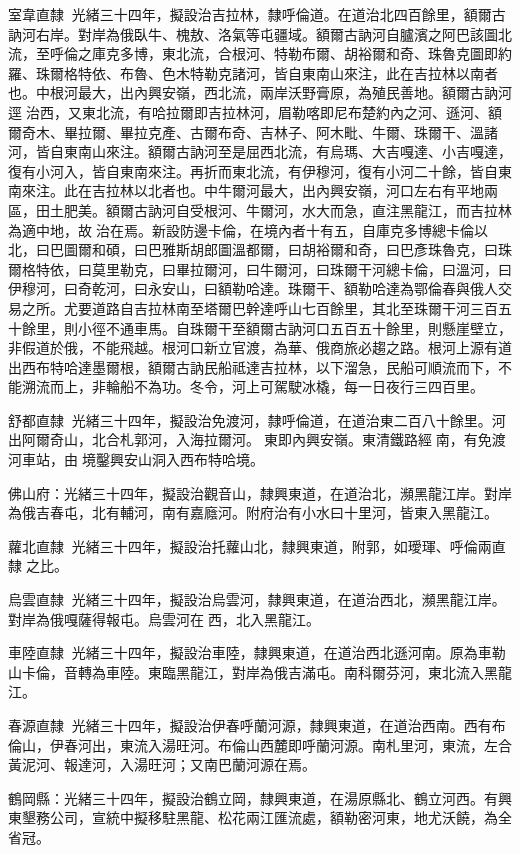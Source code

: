 \begin{pinyinscope}
室韋直隸：光緒三十四年，擬設治吉拉林，隸呼倫道。在道治北四百餘里，額爾古訥河右岸。對岸為俄臥牛、槐敖、洛氣等屯疆域。額爾古訥河自臚濱之阿巴該圖北流，至呼倫之庫克多博，東北流，合根河、特勒布爾、胡裕爾和奇、珠魯克圖即約羅、珠爾格特依、布魯、色木特勒克諸河，皆自東南山來注，此在吉拉林以南者也。中根河最大，出內興安嶺，西北流，兩岸沃野膏原，為殖民善地。額爾古訥河逕治西，又東北流，有哈拉爾即吉拉林河，眉勒喀即尼布楚約內之河、遜河、額爾奇木、畢拉爾、畢拉克產、古爾布奇、吉林子、阿木毗、牛爾、珠爾干、溫諸河，皆自東南山來注。額爾古訥河至是屈西北流，有烏瑪、大吉嘎達、小吉嘎達，復有小河入，皆自東南來注。再折而東北流，有伊穆河，復有小河二十餘，皆自東南來注。此在吉拉林以北者也。中牛爾河最大，出內興安嶺，河口左右有平地兩區，田土肥美。額爾古訥河自受根河、牛爾河，水大而急，直注黑龍江，而吉拉林為適中地，故治在焉。新設防邊卡倫，在境內者十有五，自庫克多博總卡倫以北，曰巴圖爾和碩，曰巴雅斯胡郎圖溫都爾，曰胡裕爾和奇，曰巴彥珠魯克，曰珠爾格特依，曰莫里勒克，曰畢拉爾河，曰牛爾河，曰珠爾干河總卡倫，曰溫河，曰伊穆河，曰奇乾河，曰永安山，曰額勒哈達。珠爾干、額勒哈達為鄂倫春與俄人交易之所。尤要道路自吉拉林南至塔爾巴幹達呼山七百餘里，其北至珠爾干河三百五十餘里，則小徑不通車馬。自珠爾干至額爾古訥河口五百五十餘里，則懸崖壁立，非假道於俄，不能飛越。根河口新立官渡，為華、俄商旅必趨之路。根河上源有道出西布特哈達墨爾根，額爾古訥民船祗達吉拉林，以下溜急，民船可順流而下，不能溯流而上，非輪船不為功。冬令，河上可駕駛冰橇，每一日夜行三四百里。

舒都直隸：光緒三十四年，擬設治免渡河，隸呼倫道，在道治東二百八十餘里。河出阿爾奇山，北合札郭河，入海拉爾河。東即內興安嶺。東清鐵路經南，有免渡河車站，由境鑿興安山洞入西布特哈境。

佛山府：光緒三十四年，擬設治觀音山，隸興東道，在道治北，瀕黑龍江岸。對岸為俄吉春屯，北有輔河，南有嘉廕河。附府治有小水曰十里河，皆東入黑龍江。

蘿北直隸：光緒三十四年，擬設治托蘿山北，隸興東道，附郭，如璦琿、呼倫兩直隸之比。

烏雲直隸：光緒三十四年，擬設治烏雲河，隸興東道，在道治西北，瀕黑龍江岸。對岸為俄嘎薩得報屯。烏雲河在西，北入黑龍江。

車陸直隸：光緒三十四年，擬設治車陸，隸興東道，在道治西北遜河南。原為車勒山卡倫，音轉為車陸。東臨黑龍江，對岸為俄吉滿屯。南科爾芬河，東北流入黑龍江。

春源直隸：光緒三十四年，擬設治伊春呼蘭河源，隸興東道，在道治西南。西有布倫山，伊春河出，東流入湯旺河。布倫山西麓即呼蘭河源。南札里河，東流，左合黃泥河、報達河，入湯旺河；又南巴蘭河源在焉。

鶴岡縣：光緒三十四年，擬設治鶴立岡，隸興東道，在湯原縣北、鶴立河西。有興東墾務公司，宣統中擬移駐黑龍、松花兩江匯流處，額勒密河東，地尤沃饒，為全省冠。


\end{pinyinscope}